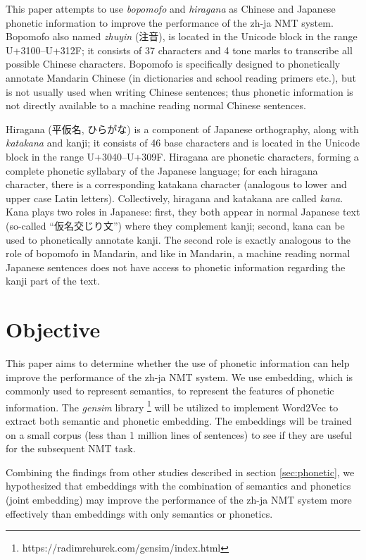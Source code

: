 This paper attempts to use \textit{bopomofo} and \textit{hiragana} as Chinese and Japanese phonetic information to improve the performance of the zh-ja NMT system. Bopomofo also named \textit{zhuyin} (注音), is located in the Unicode block in the range U+3100–U+312F; it consists of 37 characters and 4 tone marks to transcribe all possible Chinese characters. Bopomofo is specifically designed to phonetically annotate Mandarin Chinese (in dictionaries and school reading primers etc.), but is not usually used when writing Chinese sentences; thus phonetic information is not directly available to a machine reading normal Chinese sentences. \begin{CJK}{UTF8}{ipxm}Hiragana (平仮名, ひらがな) is a component of Japanese orthography, along with \textit{katakana} and kanji; it consists of 46 base characters and is located in the Unicode block in the range U+3040–U+309F. Hiragana are phonetic characters, forming a complete phonetic syllabary of the Japanese language; for each hiragana character, there is a corresponding katakana character (analogous to lower and upper case Latin letters). Collectively, hiragana and katakana are called \textit{kana}. Kana plays two roles in Japanese: first, they both appear in normal Japanese text (so-called ``仮名交じり文'') where they complement kanji; second, kana can be used to phonetically annotate kanji. The second role is exactly analogous to the role of bopomofo in Mandarin, and like in Mandarin, a machine reading normal Japanese sentences does not have access to phonetic information regarding the kanji part of the text.
\end{CJK}


\section{Objective} \label{sec:objective}

This paper aims to determine whether the use of phonetic information can help improve the performance of the zh-ja NMT system. We use embedding, which is commonly used to represent semantics, to represent the features of phonetic information. The \textit{gensim} library \footnote{https://radimrehurek.com/gensim/index.html} will be utilized to implement Word2Vec \cite{mikolov2013efficient} to extract both semantic and phonetic embedding. The embeddings will be trained on a small corpus (less than 1 million lines of sentences) to see if they are useful for the subsequent NMT task.

Combining the findings from other studies \cite{liu-etal-2019-robust, khan2019diversity} described in section \ref{sec:phonetic}, we hypothesized that embeddings with the combination of semantics and phonetics (joint embedding) may improve the performance of the zh-ja NMT system more effectively than embeddings with only semantics or phonetics. 


